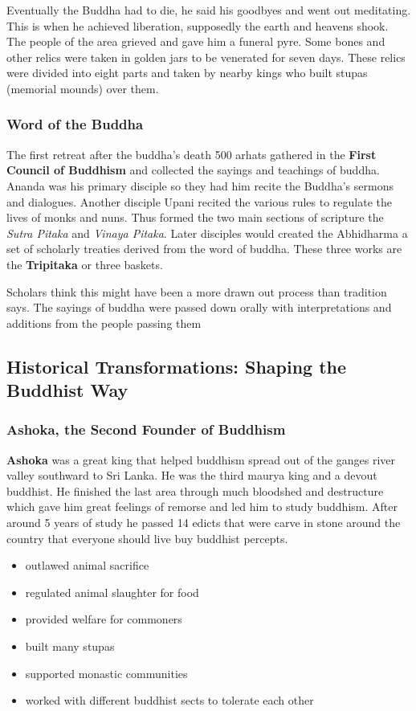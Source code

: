 \documentclass{article}
\begin{document}
Eventually the Buddha had to die, he said his goodbyes and went out meditating. This is when he achieved liberation, supposedly the earth and heavens shook. The people of the area grieved and gave him a funeral pyre. Some bones and other relics were taken in golden jars to be venerated for seven days. These relics were divided into eight parts and taken by nearby kings who built stupas (memorial mounds) over them.

\subsubsection{Word of the Buddha}
\label{ssub:word_of_the_buddha}
The first retreat after the buddha's death 500 arhats gathered in the \textbf{First Council of Buddhism} and collected the sayings and teachings of buddha. Ananda was his primary disciple so they had him recite the Buddha's sermons and dialogues. Another disciple Upani recited the various rules to regulate the lives of monks and nuns. Thus formed the two main sections of scripture the \emph{Sutra Pitaka} and \emph{Vinaya Pitaka}. Later disciples would created the Abhidharma a set of scholarly treaties derived from the word of buddha. These three works are the \textbf{Tripitaka} or three baskets.

Scholars think this might have been a more drawn out process than tradition says. The sayings of buddha were passed down orally with interpretations and additions from the people passing them

\subsection{Historical Transformations: Shaping the Buddhist Way}
\label{sub:historical_transformations_shaping_the_buddhist_way}
\subsubsection{Ashoka, the Second Founder of Buddhism}
\label{ssub:ashoka_the_second_founder_of_buddhism}
\textbf{Ashoka} was a great king that helped buddhism spread out of the ganges river valley southward to Sri Lanka. He was the third maurya king and a devout buddhist. He finished the last area through much bloodshed and destructure which gave him great feelings of remorse and led him to study buddhism. After around 5 years of study he passed 14 edicts that were carve in stone around the country that everyone should live buy buddhist percepts.
\begin{itemize}
	\item outlawed animal sacrifice
	\item regulated animal slaughter for food
	\item provided welfare for commoners
	\item built many stupas
	\item supported monastic communities
	\item worked with different buddhist sects to tolerate each other
\end{itemize}
\end{document}
